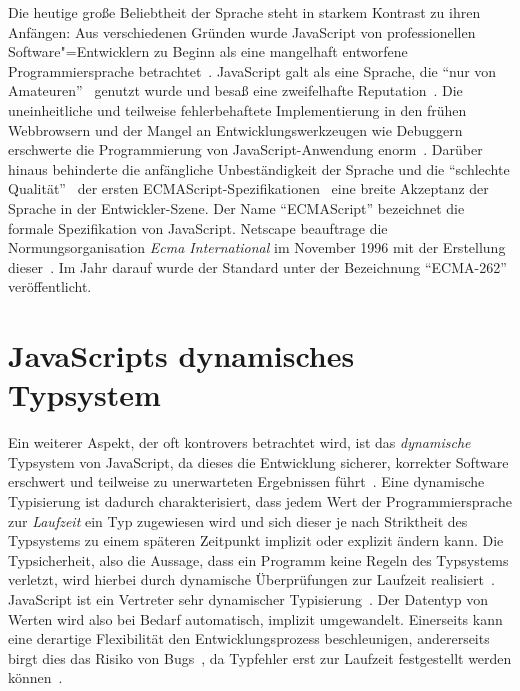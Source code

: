 Die heutige große Beliebtheit der Sprache steht in starkem Kontrast zu ihren Anfängen: Aus verschiedenen Gründen wurde JavaScript von professionellen Software"=Entwicklern zu Beginn als eine mangelhaft entworfene Programmiersprache betrachtet~\autocite{CROCKFORD:JS_POPULAR}. JavaScript galt als eine Sprache, die \enquote{nur von Amateuren}~\autocite{CROCKFORD:JS_MISUNDERSTOOD} genutzt wurde und besaß eine zweifelhafte Reputation~\autocite{THIEMANN:2005,THOMAS:2007}. Die uneinheitliche und teilweise fehlerbehaftete Implementierung in den frühen Webbrowsern und der Mangel an Entwicklungswerkzeugen wie Debuggern erschwerte die Programmierung von JavaScript-Anwendung enorm~\autocite{OREILLY:JS_HOW_DID_WE_GET_THERE}. Darüber hinaus behinderte die anfängliche Unbeständigkeit der Sprache und die \enquote{schlechte Qualität}~\autocite{CROCKFORD:JS_MISUNDERSTOOD} der ersten ECMAScript-Spezifikationen~\autocite{ECMASCRIPT:1997} eine breite Akzeptanz der Sprache in der Entwickler-Szene. Der Name \enquote{ECMAScript} bezeichnet die formale Spezifikation von JavaScript. Netscape beauftrage die Normungsorganisation \textit{Ecma International} im November 1996 mit der Erstellung dieser~\autocite{ECMASCRIPT:1997}. Im Jahr darauf wurde der Standard unter der Bezeichnung \enquote{ECMA-262} veröffentlicht.

\section{JavaScripts dynamisches Typsystem}

Ein weiterer Aspekt, der oft kontrovers betrachtet wird, ist das \emph{dynamische} Typsystem von JavaScript, da dieses die Entwicklung sicherer, korrekter Software erschwert und teilweise zu unerwarteten Ergebnissen führt~\autocite{NIKHIL:2014,PRADEL:2015}. Eine dynamische Typisierung ist dadurch charakterisiert, dass jedem Wert der Programmiersprache zur \emph{Laufzeit} ein Typ zugewiesen wird und sich dieser je nach Striktheit des Typsystems zu einem späteren Zeitpunkt implizit oder explizit ändern kann. Die Typsicherheit, also die Aussage, dass ein Programm keine Regeln des Typsystems verletzt, wird hierbei durch dynamische Überprüfungen zur Laufzeit realisiert~\autocite[37]{CARDELLI:TYPE_SYSTEMS}. JavaScript ist ein Vertreter sehr dynamischer Typisierung~\autocite{RICHARDS:2010}. Der Datentyp von Werten wird also bei Bedarf automatisch, implizit umgewandelt. Einerseits kann eine derartige Flexibilität den Entwicklungsprozess beschleunigen, andererseits birgt dies das Risiko von Bugs~\autocite[1]{FLOW:PAPER}, da Typfehler erst zur Laufzeit festgestellt werden können~\autocite{ANDERSON:2005}.

